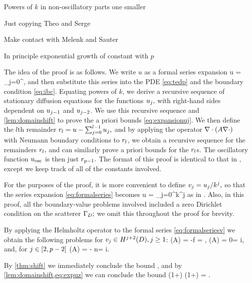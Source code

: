 \enth

\bit
\item Powers of $k$ in non-oscillatory parts one smaller
\item Just copying Theo and Serge
\item Make contact with Melenk and Sauter
\item In principle exponential growth of constant with $p$
\eit

The idea of the proof is as follows. We write $u$ as a formal series expansion
\beq\label{eq:formalseries}
u = \sum_{j=0}^\infty \usj,
\eeq
and then substitute this series into the PDE \cref{eq:tedp} and the boundary condition \eqref{eq:ibc}. Equating powers of $k$, we derive a recursive sequence of stationary diffusion equations for the functions $u_{j},$ with right-hand sides dependent on $u_{j-1}$ and $u_{j-2}$. We use this recursive sequence and \cref{lem:domainshift} to prove the a priori bounds \cref{eq:expansionuj}. We then define the $l$th remainder $r_{l} = u - \sum_{j=0}^{l-1} u_{j},$ and by applying the operator $\grad\cdot\mleft(A\grad \cdot\mright)$ with Neumann boundary conditions to $r_{l}$, we obtain a recursive sequence for the remainders $r_{l},$ and can similarly prove a priori bounds for the $r_{l}$s. The oscillatory function $u_{\mathrm{osc}}$ is then just $r_{p-1}.$ The format of this proof is identical to that in \cite[Theorem 1]{ChNi:18a}, except we keep track of all of the constants involved.

For the purposes of the proof, it is more convenient to define $v_{j} = u_{j}/k^j,$ so that the series expansion \cref{eq:formalseries} becomes
\beq\label{eq:formalseriesv}
u = \sum_{j=0}^\infty k^j\vj
\eeq
as in \cite{ChNi:18a}. Also, in this proof, all the boundary-value problems involved included a zero Dirichlet condition on the scatterer $\Gamma_{D};$ we omit this throughout the proof for brevity.

By applying the Helmholtz operator to the formal series \eqref{eq:formalseriesv} we obtain the following problems for $\vj \in \HjptD, j \geq 1$:
\beqs
\grad \cdot \mleft(A\grad \vz\mright) = -f \quad\tand\quad \dn \vz = \gI,
\eeqs
\beqs
\grad \cdot \mleft(A\grad \vo\mright) = 0\quad\tand\quad\dn \vo = i\vz,
\eeqs
and, for $j \in \mleft[2,p-2\mright]$
\beq\label{eq:vj}
\grad \cdot \mleft(A\grad \vj\mright) = - n\vjmt\quad\tand\quad\dn \vz = i\vjmo.
\eeq

By \cref{thm:shift} we immediately conclude the bound
\beq\label{eq:expuz}
\NHtD{\vz} \leq \CAz\Cfg \leq {}\Cfg,
\eeq
and by \cref{lem:domainshift,eq:expuz} we can conclude the bound
\beqs
\NHthD{\vo} \leq \CAo \mleft(1+\CTrt\mright) \leq \max{}\mleft(1+\mright) \Cfg = \Cfg.
\eeqs

